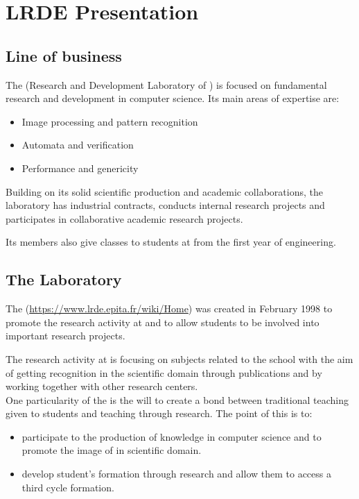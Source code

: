 \chapter{LRDE Presentation}


\section{Line of business}
The \LRDE\space (Research and Development Laboratory of \EPITA) is focused on fundamental
research and development in computer science. Its main areas of expertise are:
\begin{itemize}
 \item Image processing and pattern recognition
 \item Automata and verification
 \item Performance and genericity
\end{itemize}


\noindent Building on its solid scientific production and academic collaborations, the laboratory has
industrial contracts, conducts internal research projects and participates in collaborative
academic research projects.

\noindent Its members also give classes to students at \EPITA\space from the first year of engineering.

\section{The Laboratory}
The \LRDE\space (\url{https://www.lrde.epita.fr/wiki/Home}) was created in February 1998 to promote
the research activity at \EPITA\space and to allow students to be involved into important research
projects.

The research activity at \LRDE\space is focusing on subjects related to the school with the aim
of getting recognition in the scientific domain through publications and by working together with other
research centers.\\
One particularity of the \LRDE\space is the will to create a bond between traditional
teaching given to \EPITA\space students and teaching through research. The point of this is to:
\begin{itemize}
  \item participate to the production of knowledge in computer science and to
	promote the image of \EPITA\space in scientific domain.
  \item develop \LRDE\space student's formation through research and allow them to access a third cycle
	formation.
\end{itemize}


